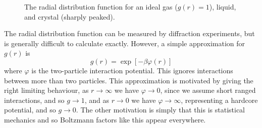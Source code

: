 \documentclass[fleqn]{NotesClass}
\begin{document}
    \begin{figure}
        \caption[Radial distribution function.]{The radial distribution function for an ideal gas (\(g(r) = 1\)), liquid, and crystal (sharply peaked).}
        \label{fig:radial distribution function}
    \end{figure}

    The radial distribution function can be measured by diffraction experiments, but is generally difficult to calculate exactly.
    However, a simple approximation for \(g(r)\) is
    \begin{equation}
        g(r) = \exp[-\beta \varphi(r)]
    \end{equation}
    where \(\varphi\) is the two-particle interaction potential.
    This ignores interactions between more than two particles.
    This approximation is motivated by giving the right limiting behaviour, as \(r \to \infty\) we have \(\varphi \to 0\), since we assume short ranged interactions, and so \(g \to 1\), and as \(r \to 0\) we have \(\varphi \to \infty\), representing a hardcore potential, and so \(g \to 0\).
    The other motivation is simply that this is statistical mechanics and so Boltzmann factors like this appear everywhere.
    
\end{document}
